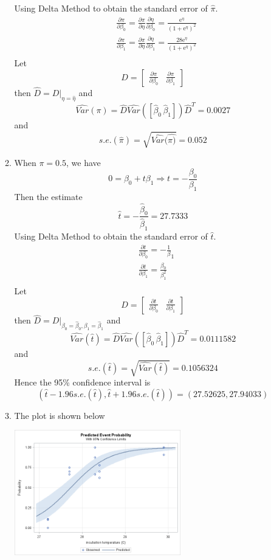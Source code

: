 \documentclass{article}
\begin{document}
\begin{enumerate}[leftmargin = 0 em, label = \arabic*., font = \bfseries]
\begin{enumerate}
	Using Delta Method to obtain the standard error of $\hat{\pi}$.
	\begin{align*}
	 & \frac{\partial \pi}{\partial \beta_0} = \frac{\partial \pi}{\partial \eta}\frac{\partial \eta}{\partial \beta_0} = \frac{\mathrm{e}^\eta}{(1 + \mathrm{e}^\eta)^2}\\
	 & \frac{\partial \pi}{\partial \beta_1} = \frac{\partial \pi}{\partial \eta}\frac{\partial \eta}{\partial \beta_1} = \frac{28\mathrm{e}^\eta}{(1 + \mathrm{e}^\eta)^2}\\
	 \end{align*}
	 Let
	 \[D = \begin{bmatrix}
	 	\frac{\partial \pi}{\partial \beta_0} & \frac{\partial \pi}{\partial \beta_1}
	 \end{bmatrix}\]
	 then $\hat{D} = D|_{\eta = \hat{\eta}}$ and
	 \[\widehat{Var}(\pi) = \hat{D}\widehat{Var}([\hat{\beta}_0\, \hat{\beta}_1])\hat{D}^T = 0.0027\]
	 and
	 \[s.e.(\hat{\pi}) = \sqrt{\widehat{Var}(\hat{\pi)}} = 0.052\]

	 \item 
	When $\pi = 0.5$, we have
	\[0 = \beta_0 + t \beta_1 \Rightarrow t = -\frac{\beta_0}{\beta_1}\]
	Then the estimate
	\[\hat{t} = -\frac{\hat{\beta}_0}{\hat{\beta}_1} = 27.7333\]
	Using Delta Method to obtain the standard error of $\hat{t}$.
	\begin{align*}
	 & \frac{\partial t}{\partial \beta_0} = -\frac{1}{\beta}_1\\
	 & \frac{\partial t}{\partial \beta_1} = \frac{\beta_0}{\beta_1^2}\\
	 \end{align*}
	 Let
	 \[D = \begin{bmatrix}
	 	\frac{\partial t}{\partial \beta_0} & \frac{\partial t}{\partial \beta_1}
	 \end{bmatrix}\]
	 then $\hat{D} = D|_{\beta_0= \hat{\beta}_0, \beta_1 = \hat{\beta}_1}$ and
	 \[\widehat{Var}(\hat{t}) = \hat{D}\widehat{Var}([\hat{\beta}_0\, \hat{\beta}_1])\hat{D}^T = 0.0111582\]
	 and
	 \[s.e.(\hat{t}) = \sqrt{\widehat{Var}(\hat{t})} = 0.1056324\]
	 Hence the 95\% confidence interval is
	 \[(\hat{t} - 1.96 s.e.(\hat{t}), \hat{t} + 1.96 s.e.(\hat{t})) = (27.52625, 27.94033)\]

	 \item 
	 The plot is shown below
	 \begin{center}
	 	\includegraphics[width = 0.6\textwidth]{EffectPlot.png}
	 \end{center}


\end{enumerate}
\end{enumerate}
\end{document}

